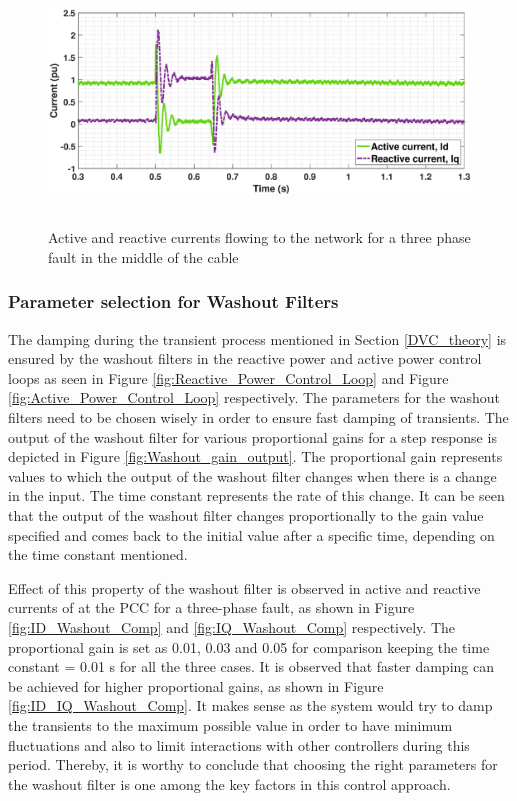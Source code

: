 \begin{figure}[H]
    \includegraphics[height = 6.5cm,width = \textwidth]{Diagrams/Chapter_3/ID_IQ_Final_4.eps}
    \caption{Active and reactive currents flowing to the network for a three phase fault in the middle of the cable}
    \label{fig:ID_IQ_Final_3}
\end{figure}


\subsubsection{Parameter selection for Washout Filters}\label{para_selection_washout}
The damping during the transient process mentioned in Section \ref{DVC_theory} is ensured by the washout filters in the reactive power and active power control loops as seen in Figure \ref{fig:Reactive_Power_Control_Loop} and Figure \ref{fig:Active_Power_Control_Loop} respectively. The parameters for the washout filters need to be chosen wisely in order to ensure fast damping of transients. The output of the washout filter for various proportional gains for a step response is depicted in Figure \ref{fig:Washout_gain_output}. The proportional gain represents values to which the output of the washout filter changes when there is a change in the input. The time constant represents the rate of this change. It can be seen that the output of the washout filter changes proportionally to the gain value specified and comes back to the initial value after a specific time, depending on the time constant mentioned.


Effect of this property of the washout filter is observed in active and reactive currents of at the \gls{PCC} for a three-phase fault, as shown in Figure \ref{fig:ID_Washout_Comp} and \ref{fig:IQ_Washout_Comp} respectively. The proportional gain is set as 0.01, 0.03 and 0.05 for comparison keeping the time constant = 0.01 s for all the three cases. It is observed that faster damping can be achieved for higher proportional gains, as shown in Figure \ref{fig:ID_IQ_Washout_Comp}. It makes sense as the system would try to damp the transients to the maximum possible value in order to have minimum fluctuations and also to limit interactions with other controllers during this period. Thereby, it is worthy to conclude that choosing the right parameters for the washout filter is one among the key factors in this control approach.

